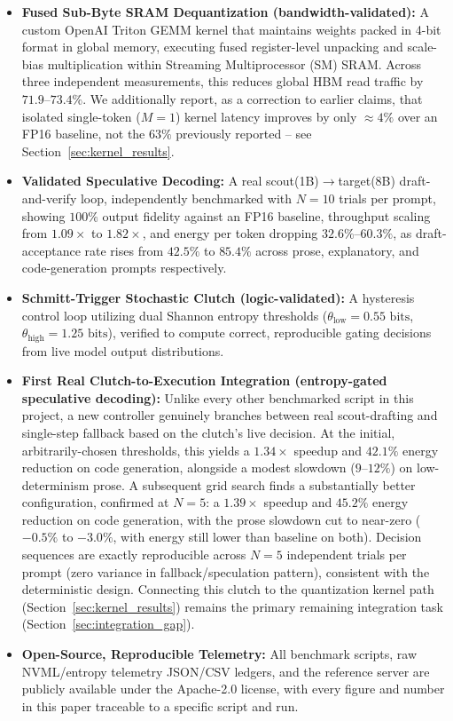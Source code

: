 \documentclass[10pt,journal,compsoc,twocolumn]{IEEEtran}
\begin{document}
\begin{itemize}
    \item \textbf{Fused Sub-Byte SRAM Dequantization (bandwidth-validated):} A custom OpenAI Triton GEMM kernel that maintains weights packed in 4-bit format in global memory, executing fused register-level unpacking and scale-bias multiplication within Streaming Multiprocessor (SM) SRAM. Across three independent measurements, this reduces global HBM read traffic by $71.9$--$73.4\%$. We additionally report, as a correction to earlier claims, that isolated single-token ($M=1$) kernel latency improves by only $\approx 4\%$ over an FP16 baseline, not the $63\%$ previously reported -- see Section~\ref{sec:kernel_results}.
    \item \textbf{Validated Speculative Decoding:} A real scout(1B)$\to$target(8B) draft-and-verify loop, independently benchmarked with $N{=}10$ trials per prompt, showing $100\%$ output fidelity against an FP16 baseline, throughput scaling from $1.09\times$ to $1.82\times$, and energy per token dropping $32.6\%$--$60.3\%$, as draft-acceptance rate rises from $42.5\%$ to $85.4\%$ across prose, explanatory, and code-generation prompts respectively.
    \item \textbf{Schmitt-Trigger Stochastic Clutch (logic-validated):} A hysteresis control loop utilizing dual Shannon entropy thresholds ($\theta_{\text{low}} = 0.55\text{ bits}$, $\theta_{\text{high}} = 1.25\text{ bits}$), verified to compute correct, reproducible gating decisions from live model output distributions.
    \item \textbf{First Real Clutch-to-Execution Integration (entropy-gated speculative decoding):} Unlike every other benchmarked script in this project, a new controller genuinely branches between real scout-drafting and single-step fallback based on the clutch's live decision. At the initial, arbitrarily-chosen thresholds, this yields a $1.34\times$ speedup and $42.1\%$ energy reduction on code generation, alongside a modest slowdown ($9$--$12\%$) on low-determinism prose. A subsequent grid search finds a substantially better configuration, confirmed at $N{=}5$: a $1.39\times$ speedup and $45.2\%$ energy reduction on code generation, with the prose slowdown cut to near-zero ($-0.5\%$ to $-3.0\%$, with energy still lower than baseline on both). Decision sequences are exactly reproducible across $N{=}5$ independent trials per prompt (zero variance in fallback/speculation pattern), consistent with the deterministic design. Connecting this clutch to the quantization kernel path (Section~\ref{sec:kernel_results}) remains the primary remaining integration task (Section~\ref{sec:integration_gap}).
    \item \textbf{Open-Source, Reproducible Telemetry:} All benchmark scripts, raw NVML/entropy telemetry JSON/CSV ledgers, and the reference server are publicly available under the Apache-2.0 license, with every figure and number in this paper traceable to a specific script and run.
\end{itemize}
\end{document}
